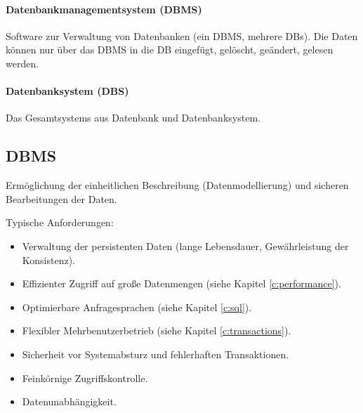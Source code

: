 \documentclass[a4paper, 11pt, accentcolor = tud3b]{tudreport}
\begin{document}
                \paragraph{Datenbankmanagementsystem (DBMS)}
	                Software zur Verwaltung von Datenbanken (ein DBMS, mehrere DBs). Die Daten können nur über das DBMS in die DB eingefügt, gelöscht, geändert, gelesen werden.
                
                \paragraph{Datenbanksystem (DBS)}
	                Das Gesamtsystems aus Datenbank und Datenbanksystem.

            \subsection{DBMS} %
                Ermöglichung der einheitlichen Beschreibung (Datenmodellierung) und sicheren Bearbeitungen der Daten.
                
                Typische Anforderungen:
                \begin{itemize}
                	\item Verwaltung der persistenten Daten (lange Lebensdauer, Gewährleistung der Konsistenz).
                	\item Effizienter Zugriff auf große Datenmengen (siehe Kapitel \ref{c:performance}).
                	\item Optimierbare Anfragesprachen (siehe Kapitel \ref{c:sql}).
                	\item Flexibler Mehrbenutzerbetrieb (siehe Kapitel \ref{c:transactions}).
                	\item Sicherheit vor Systemabsturz und fehlerhaften Transaktionen.
                	\item Feinkörnige Zugriffskontrolle.
                	\item Datenunabhängigkeit.
                \end{itemize}
                
\end{document}
